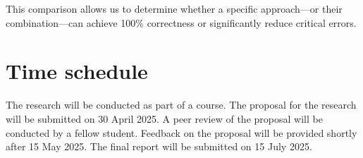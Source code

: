 \documentclass[a4paper,doc,natbib]{apa6}
\begin{document}
    This comparison allows us to determine whether a specific approach—or their combination—can achieve 100\% correctness or significantly reduce critical errors.

    \section{Time schedule}

    The research will be conducted as part of a course. The proposal for the research will be submitted on 30 April 2025. A peer review of the proposal will be conducted by a fellow student. Feedback on the proposal will be provided shortly after 15 May 2025. The final report will be submitted on 15 July 2025.

    
\end{document}
